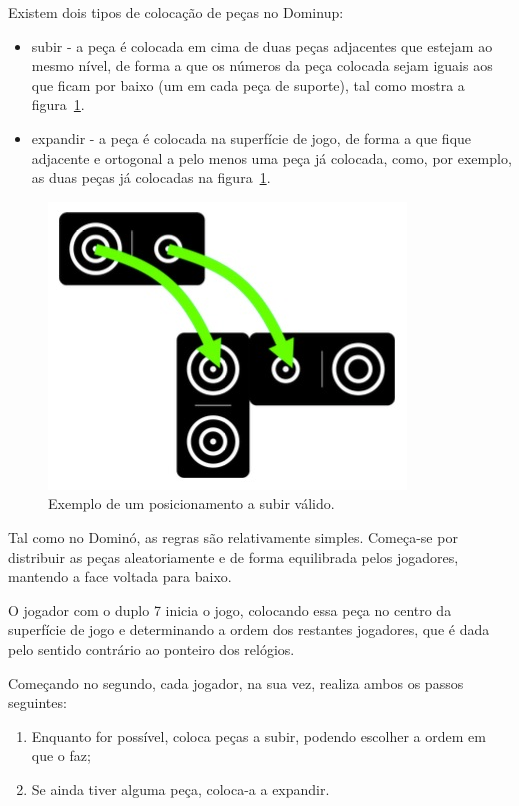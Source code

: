 \documentclass[a4paper]{article}
\begin{document}
Existem dois tipos de colocação de peças no Dominup:
\begin{itemize}
	\item subir - a peça é colocada em cima de duas peças adjacentes que estejam ao mesmo nível, de forma a que os números da peça colocada sejam iguais aos que ficam por baixo (um em cada peça de suporte), tal como mostra a figura~\ref{climb}.
	\item expandir - a peça é colocada na superfície de jogo, de forma a que fique adjacente e ortogonal a pelo menos uma peça já colocada, como, por exemplo, as duas peças já colocadas na figura~\ref{climb}.
\end{itemize}

\begin{figure}[htbp]
\begin{center}
\includegraphics[scale=0.6]{climb.jpg}
\caption{Exemplo de um posicionamento a subir válido.}
\label{climb}
\end{center}
\end{figure}

Tal como no Dominó, as regras são relativamente simples. Começa-se por distribuir as peças aleatoriamente e de forma equilibrada pelos jogadores, mantendo a face voltada para baixo. 

O jogador com o duplo 7 inicia o jogo, colocando essa peça no centro da superfície de jogo e determinando a ordem dos restantes jogadores, que é dada pelo sentido contrário ao ponteiro dos relógios. 

Começando no segundo, cada jogador, na sua vez, realiza ambos os passos seguintes:
\begin{enumerate}
	\item Enquanto for possível, coloca peças a subir, podendo escolher a ordem em que o faz;
	\item Se ainda tiver alguma peça, coloca-a a expandir.
\end{enumerate}
\end{document}
